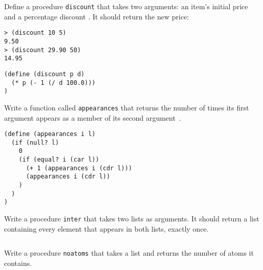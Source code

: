 \begin{questions}
\begin{solution}
\end{solution}


\question
Define a procedure \texttt{discount} that takes two arguments: an item’s initial price and a percentage discount \cite{simplyscheme}.
It should return the new price:
\begin{verbatim}
> (discount 10 5)
9.50
> (discount 29.90 50)
14.95
\end{verbatim}


\begin{solution}
  \begin{verbatim}
(define (discount p d)
  (* p (- 1 (/ d 100.0)))
)
  \end{verbatim}
\end{solution}

\question
Write a function called \texttt{appearances} that returns the number of times its first argument appears as a member of its second argument~\cite{simplyscheme}.

\begin{solution}
  \begin{verbatim}
(define (appearances i l)
  (if (null? l)
    0
    (if (equal? i (car l))	
      (+ 1 (appearances i (cdr l)))
      (appearances i (cdr l))
    )
  )
)   
  \end{verbatim}
\end{solution}

\question
Write a procedure \texttt{inter} that takes two lists as arguments.
It should return a list containing every element that appears in both lists, exactly once.

\begin{solution}
  \begin{verbatim}

  \end{verbatim}
\end{solution}

\question
Write a procedure \texttt{noatoms} that takes a list and returns the number of atoms it contains.


\end{questions}
